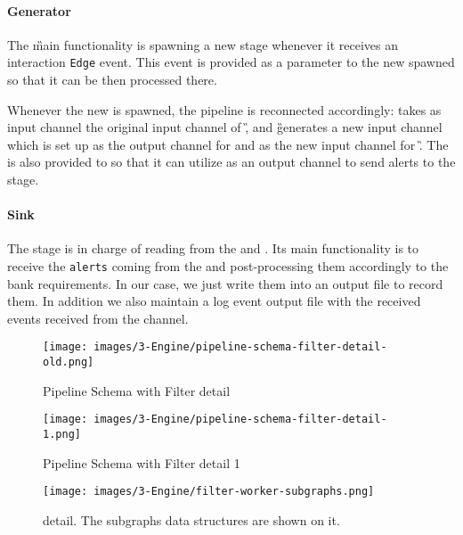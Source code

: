 \paragraph*{Generator\\}

The \generator \G main functionality is spawning a new \filter \F stage whenever it receives an interaction \texttt{Edge} event. This event is provided as a parameter to the new spawned \F so that it can be then processed there.

Whenever the new \F is spawned, the pipeline is reconnected accordingly: \F takes as \eventch input channel the original \eventch input channel of \G, and \G generates a new \eventch input channel which is set up as the output \eventch channel for \F and as the new input \eventch channel for \G. The \alertch is also provided to \F so that it can utilize as an output channel to send alerts to the \sink stage.


\paragraph*{Sink\\}

The \sink \Sk stage is in charge of reading from the \eventch and \alertch. Its main functionality is to receive the \texttt{alerts} coming from the \alertch and post-processing them accordingly to the bank requirements. In our case, we just write them into an output file to record them. In addition we also maintain a log event output file with the received events received from the \eventch channel.

\begin{figure}[H]
  \centering
  \texttt{[image: images/3-Engine/pipeline-schema-filter-detail-old.png]}
  \caption{Pipeline Schema with Filter detail}
  \label{img:pipeline-schema-0}
\end{figure}

\begin{figure}[H]
  \centering
  \texttt{[image: images/3-Engine/pipeline-schema-filter-detail-1.png]}
  \caption{Pipeline Schema with Filter detail 1}
  \label{img:pipeline-schema-1}
\end{figure}

\begin{figure}[H]
  \centering
  \texttt{[image: images/3-Engine/filter-worker-subgraphs.png]}
  \caption{\filterworker detail. The subgraphs data structures are shown on it.}
  \label{img:filterworker-subgraphs}
\end{figure}
